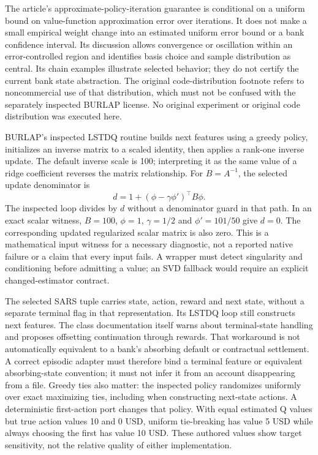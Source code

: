 The article's approximate-policy-iteration guarantee is conditional on a uniform bound on value-function approximation error over iterations. It does not make a small empirical weight change into an estimated uniform error bound or a bank confidence interval. Its discussion allows convergence or oscillation within an error-controlled region and identifies basis choice and sample distribution as central. Its chain examples illustrate selected behavior; they do not certify the current bank state abstraction. The original code-distribution footnote refers to noncommercial use of that distribution, which must not be confused with the separately inspected BURLAP license. No original experiment or original code distribution was executed here.\citep{exec24_policyjava_lspi}

BURLAP's inspected LSTDQ routine builds next features using a greedy policy, initializes an inverse matrix to a scaled identity, then applies a rank-one inverse update. The default inverse scale is 100; interpreting it as the same value of a ridge coefficient reverses the matrix relationship. For $B=A^{-1}$, the selected update denominator is
\[
 d=1+(\phi-\gamma\phi')^\top B\phi.
\]
The inspected loop divides by $d$ without a denominator guard in that path. In an exact scalar witness, $B=100$, $\phi=1$, $\gamma=1/2$ and $\phi'=101/50$ give $d=0$. The corresponding updated regularized scalar matrix is also zero. This is a mathematical input witness for a necessary diagnostic, not a reported native failure or a claim that every input fails. A wrapper must detect singularity and conditioning before admitting a value; an SVD fallback would require an explicit changed-estimator contract.\citep{exec24_policyjava_burlap,exec24_policyjava_comparison}

The selected SARS tuple carries state, action, reward and next state, without a separate terminal flag in that representation. Its LSTDQ loop still constructs next features. The class documentation itself warns about terminal-state handling and proposes offsetting continuation through rewards. That workaround is not automatically equivalent to a bank's absorbing default or contractual settlement. A correct episodic adapter must therefore bind a terminal feature or equivalent absorbing-state convention; it must not infer it from an account disappearing from a file. Greedy ties also matter: the inspected policy randomizes uniformly over exact maximizing ties, including when constructing next-state actions. A deterministic first-action port changes that policy. With equal estimated Q values but true action values 10 and 0 USD, uniform tie-breaking has value 5 USD while always choosing the first has value 10 USD. These authored values show target sensitivity, not the relative quality of either implementation.\citep{exec24_policyjava_burlap,exec24_policyjava_comparison}

